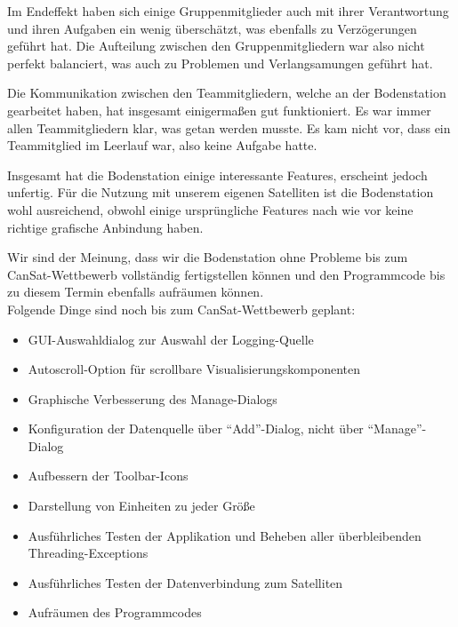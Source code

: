 Im Endeffekt haben sich einige Gruppenmitglieder auch mit ihrer Verantwortung und ihren Aufgaben ein wenig überschätzt, was ebenfalls zu Verzögerungen geführt hat. Die Aufteilung zwischen den Gruppenmitgliedern war also nicht perfekt balanciert, was auch zu Problemen und Verlangsamungen geführt hat.

Die Kommunikation zwischen den Teammitgliedern, welche an der Bodenstation gearbeitet haben, hat insgesamt einigermaßen gut funktioniert. Es war immer allen Teammitgliedern klar, was getan werden musste. Es kam nicht vor, dass ein Teammitglied im Leerlauf war, also keine Aufgabe hatte.

Insgesamt hat die Bodenstation einige interessante Features, erscheint jedoch unfertig. Für die Nutzung mit unserem eigenen Satelliten ist die Bodenstation wohl ausreichend, obwohl einige ursprüngliche Features nach wie vor keine richtige grafische Anbindung haben.

Wir sind der Meinung, dass wir die Bodenstation ohne Probleme bis zum CanSat-Wettbewerb vollständig fertigstellen können und den Programmcode bis zu diesem Termin ebenfalls aufräumen können. \\
Folgende Dinge sind noch bis zum CanSat-Wettbewerb geplant:
\begin{itemize}
	\item GUI-Auswahldialog zur Auswahl der Logging-Quelle
	\item Autoscroll-Option für scrollbare Visualisierungskomponenten
	\item Graphische Verbesserung des Manage-Dialogs
	\item Konfiguration der Datenquelle über ``Add''-Dialog, nicht über ``Manage''-Dialog
	\item Aufbessern der Toolbar-Icons
	\item Darstellung von Einheiten zu jeder Größe
	\item Ausführliches Testen der Applikation und Beheben aller überbleibenden Threading-Exceptions
	\item Ausführliches Testen der Datenverbindung zum Satelliten
	\item Aufräumen des Programmcodes
\end{itemize}

